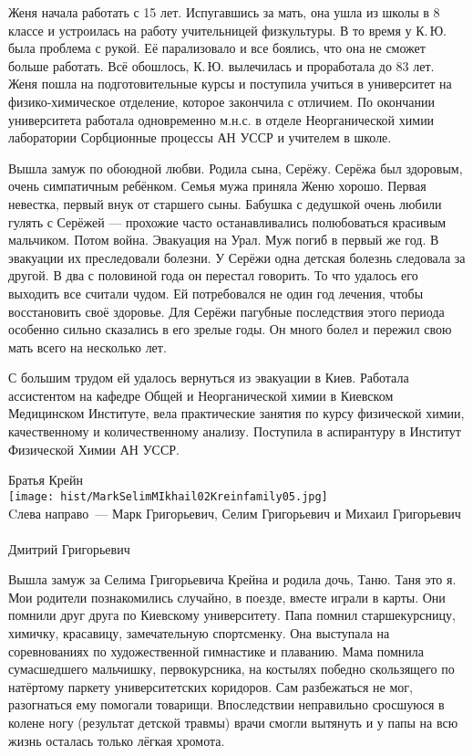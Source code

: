 Женя начала работать с 15 лет. Испугавшись за мать, она ушла из школы в 8 классе и устроилась на работу учительницей физкультуры. В то время у К.\,Ю. была проблема с рукой. Её парализовало и все боялись, что она не сможет больше работать. Всё обошлось, К.\,Ю. вылечилась и проработала до 83 лет. Женя пошла на подготовительные курсы и поступила учиться в университет на физико-химическое отделение, которое закончила с отличием. По окончании университета работала одновременно м.н.с. в отделе Неорганической химии лаборатории Сорбционные процессы АН \linebreak УССР и учителем в школе.

Вышла замуж по обоюдной любви. Родила сына, Серёжу. Серёжа был здоровым, очень симпатичным ребёнком. Семья мужа приняла Женю хорошо. Первая невестка, первый внук от старшего сыны. Бабушка с дедушкой очень любили гулять с Серёжей --- прохожие часто останавливались полюбоваться красивым мальчиком. Потом война. Эвакуация на Урал. Муж погиб в первый же год. В эвакуации их преследовали болезни. У Серёжи одна детская болезнь следовала за другой. В два с половиной года он перестал говорить. То что удалось его выходить все считали чудом. Ей потребовался не один год лечения, чтобы восстановить своё здоровье. Для Серёжи пагубные последствия этого периода особенно сильно сказались в его зрелые годы. Он много болел и пережил свою мать всего на несколько лет.

С большим трудом ей удалось вернуться из эвакуации в Киев. Работала ассистентом на кафедре Общей и Неорганической химии в Киевском Медицинском Институте, вела практические занятия по курсу физической химии, качественному и количественному анализу. Поступила в аспирантуру в Институт Физической Химии АН УССР.

\begin{center}
{\centering
Братья Крейн
\\
{\texttt{[image: hist/MarkSelimMIkhail02Kreinfamily05.jpg]}}
\\
Cлева направо~--- Марк Григорьевич, Селим Григорьевич и Михаил Григорьевич
\\
{}
\\
Дмитрий Григорьевич
}
\end{center}

Вышла замуж за Селима Григорьевича Крейна и родила дочь, Таню. Таня это я. Мои родители познакомились случайно, в поезде, вместе играли в карты. Они помнили друг друга по Киевскому университету. Папа помнил старшекурсницу, химичку, красавицу, замечательную спортсменку. Она выступала на соревнованиях по художественной гимнастике и плаванию. Мама помнила сумасшедшего мальчишку, первокурсника, на костылях победно скользящего по натёртому паркету университетских коридоров. Сам разбежаться не мог, разогнаться ему помогали товарищи. Впоследствии неправильно сросшуюся в колене ногу (результат детской травмы) врачи смогли вытянуть и у папы на всю жизнь осталась только лёгкая хромота.



